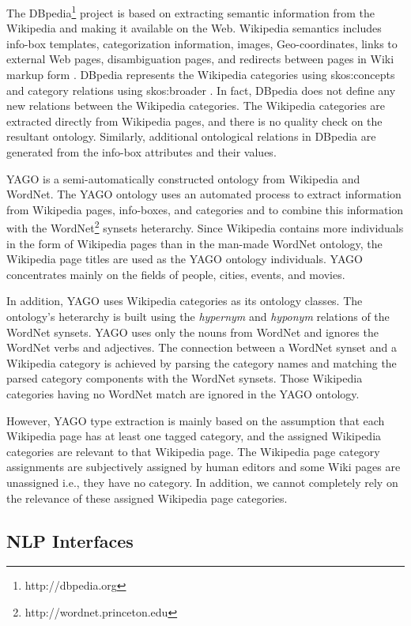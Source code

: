 The DBpedia\footnote{http://dbpedia.org} project is based on extracting 
semantic information from the Wikipedia and making it available on the Web. 
Wikipedia semantics includes info-box templates, categorization information, 
images, Geo-coordinates, links to external Web pages, disambiguation pages, 
and redirects between pages in Wiki markup form \cite{Auer07dbpedia:a, Bizer2009}. 
DBpedia represents the Wikipedia categories using skos:concepts and category 
relations using skos:broader \cite{Auer07dbpedia:a, Bizer2009}. In fact, 
DBpedia does not define any new relations between the Wikipedia categories. 
The Wikipedia categories are extracted directly from Wikipedia pages, and there 
is no quality check on the resultant ontology. Similarly, additional ontological 
relations in DBpedia are generated from the info-box attributes and their values.

YAGO is a semi-automatically constructed ontology from Wikipedia and
WordNet\cite{Suchanek2009phd}. The YAGO ontology uses an automated process to
extract information from Wikipedia pages, info-boxes, and categories and to
combine this information with the WordNet\footnote{http://wordnet.princeton.edu}
synsets heterarchy. Since Wikipedia contains more individuals in the form of
Wikipedia pages than in the man-made WordNet ontology, the Wikipedia page titles
are used as the YAGO ontology individuals. YAGO concentrates mainly on the
fields of people, cities, events, and movies\cite{Suchanek2009phd}. 

In addition, YAGO uses Wikipedia categories as its ontology classes. The
ontology's heterarchy is built using the \textit{hypernym} and \textit{hyponym}
relations of the WordNet synsets. YAGO uses only the nouns from WordNet and
ignores the WordNet verbs and adjectives. The connection between a WordNet
synset and a Wikipedia category is achieved by parsing the category names and
matching the parsed category components with the WordNet
synsets\cite{Suchanek2009phd}. Those Wikipedia categories having no WordNet
match are ignored in the YAGO ontology.  
  
However, YAGO type extraction is mainly based on the assumption that
each Wikipedia page has at least one tagged category, and the assigned Wikipedia
categories are relevant to that Wikipedia page. The Wikipedia page category
assignments are subjectively assigned by human editors and some Wiki pages are
unassigned i.e., they have no category. In addition, we cannot completely rely
on the relevance of these assigned Wikipedia page categories. 


\subsection{NLP Interfaces} 
